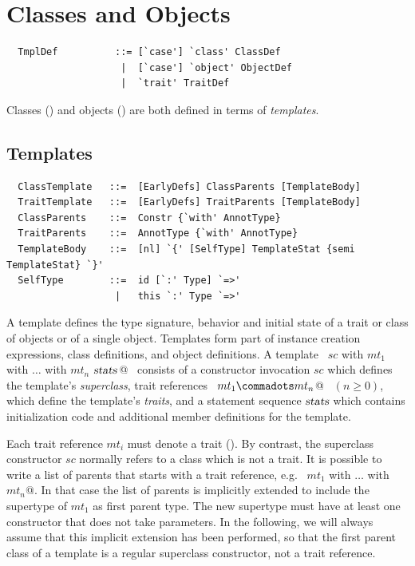 \chapter{Classes and Objects}
\label{sec:globaldefs}

\syntax\begin{lstlisting}
  TmplDef          ::= [`case'] `class' ClassDef
                    |  [`case'] `object' ObjectDef
                    |  `trait' TraitDef
\end{lstlisting}

Classes () and objects
() are both defined in terms of {\em templates}.

\section{Templates}
\label{sec:templates}

\syntax\begin{lstlisting}
  ClassTemplate   ::=  [EarlyDefs] ClassParents [TemplateBody]
  TraitTemplate   ::=  [EarlyDefs] TraitParents [TemplateBody]
  ClassParents    ::=  Constr {`with' AnnotType}
  TraitParents    ::=  AnnotType {`with' AnnotType}
  TemplateBody    ::=  [nl] `{' [SelfType] TemplateStat {semi TemplateStat} `}'
  SelfType        ::=  id [`:' Type] `=>'
                   |   this `:' Type `=>' 
\end{lstlisting}

A template defines the type signature, behavior and initial state of a
trait or class of objects or of a single object. Templates form part of
instance creation expressions, class definitions, and object
definitions.  A template 
~\lstinline@$sc$ with $mt_1$ with $\ldots$ with $mt_n$ {$\mbox{\sl stats}\,$}@~ 
consists of a constructor invocation $sc$
which defines the template's {\em superclass}, trait references
~\lstinline@$mt_1 \commadots mt_n$@~ $(n \geq 0)$, which define the
template's {\em traits}, and a statement sequence $\mbox{\sl stats}$ which
contains initialization code and additional member definitions for the
template.

Each trait reference $mt_i$ must denote a trait ().
By contrast, the superclass constructor $sc$ normally refers to a
class which is not a trait. It is possible to write a list of
parents that starts with a trait reference, e.g.
~\lstinline@$mt_1$ with $\ldots$ with $mt_n$@. In that case the list
of parents is implicitly extended to include the supertype of $mt_1$
as first parent type. The new supertype must have at least one
constructor that does not take parameters.  In the following, we will
always assume that this implicit extension has been performed, so that
the first parent class of a template is a regular superclass
constructor, not a trait reference.

